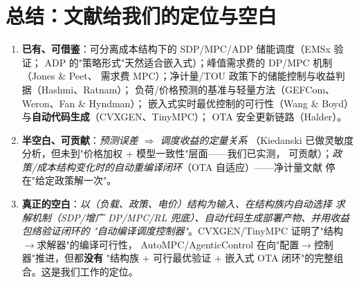 \documentclass[10pt, twocolumn]{article}
\begin{document}
\section{总结：文献给我们的定位与空白}\label{sec:conclusion}
\begin{enumerate}
\item \textbf{已有、可借鉴}：可分离成本结构下的 SDP/MPC/ADP 储能调度（EMSx 验证；
ADP 的"策略形式"天然适合嵌入式）；峰值需求费的 DP/MPC 机制（Jones \& Peet、
需求费 MPC）；净计量/TOU 政策下的储能控制与收益判据（Hashmi、Ratnam）；
负荷/价格预测的基准与轻量方法（GEFCom、Weron、Fan \& Hyndman）；
嵌入式实时最优控制的可行性（Wang \& Boyd）与\textbf{自动代码生成}（CVXGEN、TinyMPC）；
OTA 安全更新链路（Halder）。
\item \textbf{半空白、可贡献}：\emph{预测误差 $\Rightarrow$ 调度收益的定量关系}
（Kiedanski 已做灵敏度分析，但未到"价格加权 + 模型一致性"层面——我们已实测，
可贡献）；\emph{政策/成本结构变化时的自动重编译闭环}（OTA 自适应）——净计量文献
停在"给定政策解一次"。
\item \textbf{真正的空白}：\emph{以（负载、政策、电价）结构为输入、在结构族内自动选择
求解机制（SDP/增广 DP/MPC/RL 兜底）、自动代码生成部署产物、并用收益包络验证闭环的
"自动编译调度控制器"}。CVXGEN/TinyMPC 证明了"结构$\rightarrow$求解器"的编译可行性，
AutoMPC/AgenticControl 在向"配置$\rightarrow$控制器"推进，但都\textbf{没有}
"结构族 + 可行最优验证 + 嵌入式 OTA 闭环"的完整组合。这是我们工作的定位。
\end{enumerate}



\end{document}
